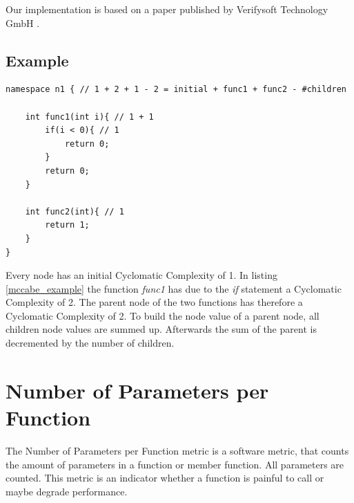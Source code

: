 \documentclass[11pt,a4paper,oneside]{scrreprt}
\begin{document}
Our implementation is based on a paper published by Verifysoft Technology GmbH \cite{mccabe_def}.
\subsection{Example}
\begin{lstlisting}[style=C++0x, caption=Code snippet example McCabe, label=mccabe_example]
namespace n1 { // 1 + 2 + 1 - 2 = initial + func1 + func2 - #children

	int func1(int i){ // 1 + 1
		if(i < 0){ // 1
			return 0;
		}
		return 0;
	}

	int func2(int){ // 1
		return 1;
	}
}
\end{lstlisting}

Every node has an initial Cyclomatic Complexity of 1. In listing \ref{mccabe_example} the function \textit{func1} has due to the \textit{if} statement a Cyclomatic Complexity of 2. The parent node of the two functions has therefore a Cyclomatic Complexity of 2. To build the node value of a parent node, all children node values are summed up. Afterwards the sum of the parent is decremented by the number of children.

\section{Number of Parameters per Function}\label{nbparams}
The Number of Parameters per Function metric is a software metric, that counts the amount of parameters in a function or member function. All parameters are counted. This metric is an indicator whether a function is painful to call or maybe degrade performance.
\end{document}
